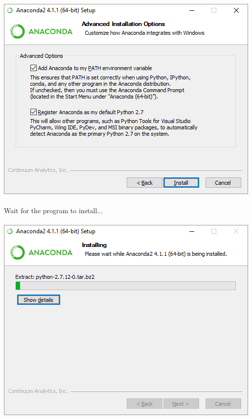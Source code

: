 \documentclass[]{article}
\begin{document}
\paragraph{}
\begin{centering}
    \centerline{\includegraphics[scale=0.7]{Screenshot_9.png}}
\end{centering}

\paragraph{}
Wait for the program to install...
\paragraph{}
\begin{centering}
    \centerline{\includegraphics[scale=0.7]{Screenshot_10.png}}
\end{centering}
\end{document}
